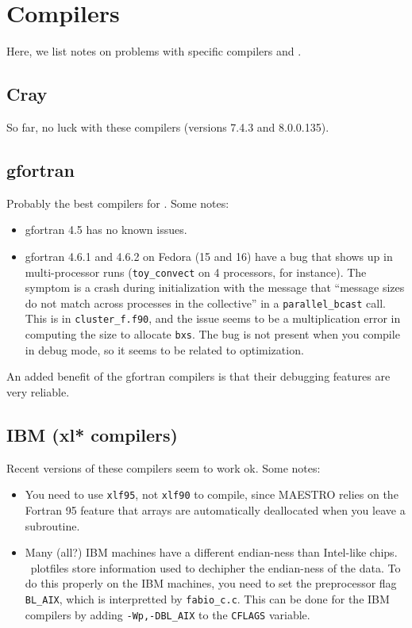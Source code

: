\section{Compilers}

Here, we list notes on problems with specific compilers and \maestro.


\subsection{Cray}

So far, no luck with these compilers (versions 7.4.3 and 8.0.0.135).


\subsection{gfortran}

Probably the best compilers for \maestro.  
Some notes:
\begin{itemize}
\item gfortran 4.5 has no known issues.
\item gfortran 4.6.1 and 4.6.2 on Fedora (15 and 16) have a bug that 
shows up in multi-processor runs ({\tt toy\_convect} on 4 processors, for instance).
The symptom is a crash during initialization with the message that
``message sizes do not match across processes in the collective'' in a
{\tt parallel\_bcast} call.  This is in {\tt cluster\_f.f90}, and the issue seems
to be a multiplication error in computing the size to allocate {\tt bxs}.
The bug is not present when you compile in debug mode, so it seems to be
related to optimization.
\end{itemize}

An added benefit of the gfortran compilers is that their debugging
features are very reliable.


\subsection{IBM (xl* compilers)}

Recent versions of these compilers seem to work ok.  Some notes:
\begin{itemize}
\item You need to use {\tt xlf95}, not {\tt xlf90} to compile, since
  MAESTRO relies on the Fortran 95 feature that arrays are
  automatically deallocated when you leave a subroutine.

\item Many (all?) IBM machines have a different endian-ness than
  Intel-like chips.  \boxlib\ plotfiles store information used to
  dechipher the endian-ness of the data.  To do this properly on
  the IBM machines, you need to set the preprocessor flag {\tt BL\_AIX},
  which is interpretted by {\tt fabio\_c.c}.  This can be done for the
  IBM compilers by adding {\tt -Wp,-DBL\_AIX} to the {\tt CFLAGS} variable.

\end{itemize}

